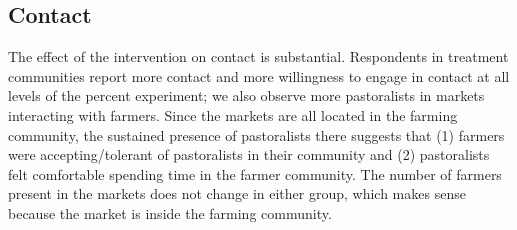 \documentclass[11pt]{article}
\begin{document}
\hypertarget{contact}{%
\subsection{Contact}\label{contact}}

The effect of the intervention on contact is substantial. Respondents in
treatment communities report more contact and more willingness to engage
in contact at all levels of the percent experiment; we also observe more
pastoralists in markets interacting with farmers. Since the markets are
all located in the farming community, the sustained presence of
pastoralists there suggests that (1) farmers were accepting/tolerant of
pastoralists in their community and (2) pastoralists felt comfortable
spending time in the farmer community. The number of farmers present in
the markets does not change in either group, which makes sense because
the market is inside the farming community.
\end{document}
